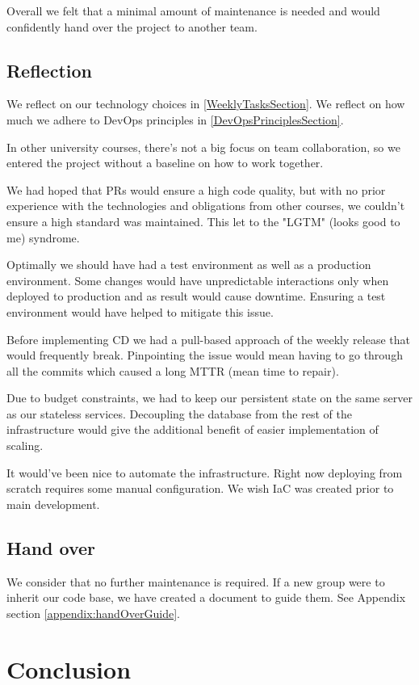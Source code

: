 \documentclass{article}
\begin{document}
Overall we felt that a minimal amount of maintenance is needed and would confidently hand over the project to another team. 

\subsection{Reflection}

We reflect on our technology choices in \ref{WeeklyTasksSection}.
We reflect on how much we adhere to DevOps principles in \ref{DevOpsPrinciplesSection}.

In other university courses, there's not a big focus on team collaboration, so we entered the project without a baseline on how to work together.

We had hoped that PRs would ensure a high code quality, but with no prior experience with the technologies and obligations from other courses, we couldn't ensure a high standard was maintained. This let to the "LGTM" (looks good to me) syndrome.

Optimally we should have had a test environment as well as a production environment. Some changes would have unpredictable interactions only when deployed to production and as result would cause downtime.  Ensuring a test environment would have helped to mitigate this issue.

Before implementing CD we had a pull-based approach of the weekly release that would frequently break. Pinpointing the issue would mean having to go through all the commits which caused a long MTTR (mean time to repair). 

Due to budget constraints, we had to keep our persistent state on the same server as our stateless services. Decoupling the database from the rest of the infrastructure would give the additional benefit of easier implementation of scaling. 

It would've been nice to automate the infrastructure. Right now deploying from scratch requires some manual configuration. We wish IaC was created prior to main development. 


\subsection{Hand over}

We consider that no further maintenance is required. If a new group were to inherit our code base, we have created a document to guide them. See Appendix section \ref{appendix:handOverGuide}. 

\section{Conclusion}
\end{document}
